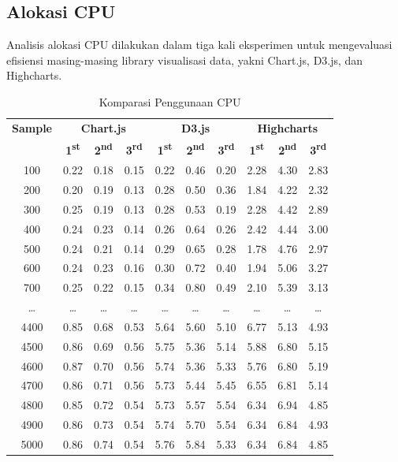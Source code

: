\subsection{Alokasi CPU}
Analisis alokasi CPU dilakukan dalam tiga kali eksperimen untuk mengevaluasi efisiensi masing-masing library visualisasi data, yakni Chart.js, D3.js, dan Highcharts.
\begin{table}[H]
	\centering
	\caption{Komparasi Penggunaan CPU}
	\begin{tabular}{|c|ccc|ccc|ccc|}
		\hline
		\textbf{Sample} & \multicolumn{3}{c|}{\textbf{Chart.js}} & \multicolumn{3}{c|}{\textbf{D3.js}} & \multicolumn{3}{c|}{\textbf{Highcharts}} \\
		& \textbf{1\textsuperscript{st}} & \textbf{2\textsuperscript{nd}} & \textbf{3\textsuperscript{rd}} & \textbf{1\textsuperscript{st}} & \textbf{2\textsuperscript{nd}} & \textbf{3\textsuperscript{rd}} & \textbf{1\textsuperscript{st}} & \textbf{2\textsuperscript{nd}} & \textbf{3\textsuperscript{rd}} \\
		\hline
		100  & 0.22 & 0.18 & 0.15 & 0.22 & 0.46 & 0.20 & 2.28 & 4.30 & 2.83 \\
		200  & 0.20 & 0.19 & 0.13 & 0.28 & 0.50 & 0.36 & 1.84 & 4.22 & 2.32 \\
		300  & 0.25 & 0.19 & 0.13 & 0.28 & 0.53 & 0.19 & 2.28 & 4.42 & 2.89 \\
		400  & 0.24 & 0.23 & 0.14 & 0.26 & 0.64 & 0.26 & 2.42 & 4.44 & 3.00 \\
		500  & 0.24 & 0.21 & 0.14 & 0.29 & 0.65 & 0.28 & 1.78 & 4.76 & 2.97 \\
		600  & 0.24 & 0.23 & 0.16 & 0.30 & 0.72 & 0.40 & 1.94 & 5.06 & 3.27 \\
		700  & 0.25 & 0.22 & 0.15 & 0.34 & 0.80 & 0.49 & 2.10 & 5.39 & 3.13 \\
		\ldots & \ldots & \ldots & \ldots & \ldots & \ldots & \ldots & \ldots & \ldots & \ldots \\
		4400 & 0.85 & 0.68 & 0.53 & 5.64 & 5.60 & 5.10 & 6.77 & 5.13 & 4.93 \\
		4500 & 0.86 & 0.69 & 0.56 & 5.75 & 5.36 & 5.14 & 5.88 & 6.80 & 5.15 \\
		4600 & 0.87 & 0.70 & 0.56 & 5.74 & 5.36 & 5.33 & 5.76 & 6.80 & 5.19 \\
		4700 & 0.86 & 0.71 & 0.56 & 5.73 & 5.44 & 5.45 & 6.55 & 6.81 & 5.14 \\
		4800 & 0.85 & 0.72 & 0.54 & 5.73 & 5.57 & 5.54 & 6.34 & 6.94 & 4.85 \\
		4900 & 0.86 & 0.73 & 0.54 & 5.74 & 5.70 & 5.54 & 6.34 & 6.84 & 4.93 \\
		5000 & 0.86 & 0.74 & 0.54 & 5.76 & 5.84 & 5.33 & 6.34 & 6.84 & 4.85 \\
		\hline
	\end{tabular}
\end{table}
